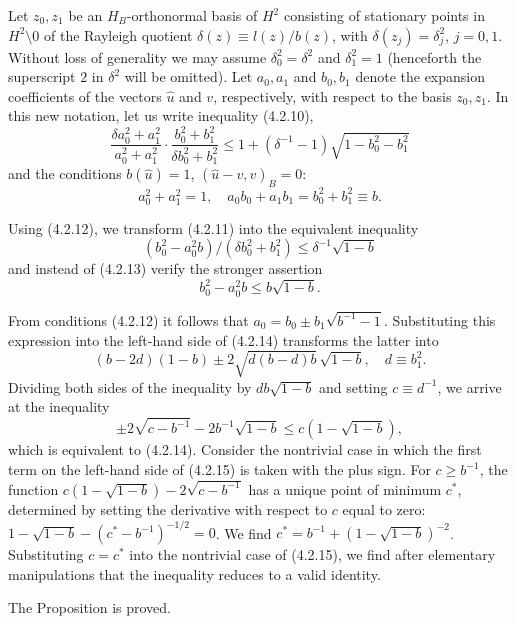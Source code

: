 \documentclass[11pt,oneside]{book}
\begin{document}
Let $z_0, z_1$ be an $H_B$-orthonormal basis of $H^2$ consisting of stationary points in $H^2 \setminus 0$ of the Rayleigh quotient $\delta(z) \equiv l(z) / b(z)$, with $\delta(z_j) = \delta_j^2$, $j = 0, 1$. Without loss of generality we may assume $\delta_0^2 = \delta^2$ and $\delta_1^2 = 1$ (henceforth the superscript $2$ in $\delta^2$ will be omitted). Let $a_0, a_1$ and $b_0, b_1$ denote the expansion coefficients of the vectors $\hat{u}$ and $v$, respectively, with respect to the basis $z_0, z_1$. In this new notation, let us write inequality (4.2.10),
\[
\frac{\delta a_0^2 + a_1^2}{a_0^2 + a_1^2} \cdot \frac{b_0^2 + b_1^2}{\delta b_0^2 + b_1^2} \leqslant 1 + (\delta^{-1} - 1) \sqrt{1 - b_0^2 - b_1^2} \tag{4.2.11}
\]
and the conditions $b(\hat{u}) = 1$, $(\hat{u} - v, v)_B = 0$:
\[
a_0^2 + a_1^2 = 1, \quad a_0 b_0 + a_1 b_1 = b_0^2 + b_1^2 \equiv b. \tag{4.2.12}
\]

Using (4.2.12), we transform (4.2.11) into the equivalent inequality
\[
(b_0^2 - a_0^2 b) / (\delta b_0^2 + b_1^2) \leqslant \delta^{-1} \sqrt{1 - b} \tag{4.2.13}
\]
and instead of (4.2.13) verify the stronger assertion
\[
b_0^2 - a_0^2 b \leqslant b \sqrt{1 - b}. \tag{4.2.14}
\]

From conditions (4.2.12) it follows that $a_0 = b_0 \pm b_1 \sqrt{b^{-1} - 1}$. Substituting this expression into the left-hand side of (4.2.14) transforms the latter into
\[
(b - 2d)(1 - b) \pm 2 \sqrt{d (b - d) b} \, \sqrt{1 - b}, \quad d \equiv b_1^2.
\]
Dividing both sides of the inequality by $d b \sqrt{1 - b}$ and setting $c \equiv d^{-1}$, we arrive at the inequality
\[
\pm 2 \sqrt{c - b^{-1}} - 2 b^{-1} \sqrt{1 - b} \leqslant c (1 - \sqrt{1 - b}), \tag{4.2.15}
\]
which is equivalent to (4.2.14). Consider the nontrivial case in which the first term on the left-hand side of (4.2.15) is taken with the plus sign. For $c \geqslant b^{-1}$, the function $c (1 - \sqrt{1 - b}) - 2 \sqrt{c - b^{-1}}$ has a unique point of minimum $c^*$, determined by setting the derivative with respect to $c$ equal to zero: $1 - \sqrt{1 - b} - (c^* - b^{-1})^{-1/2} = 0$. We find $c^* = b^{-1} + (1 - \sqrt{1 - b})^{-2}$. Substituting $c = c^*$ into the nontrivial case of (4.2.15), we find after elementary manipulations that the inequality reduces to a valid identity.

The Proposition is proved.
\end{document}
